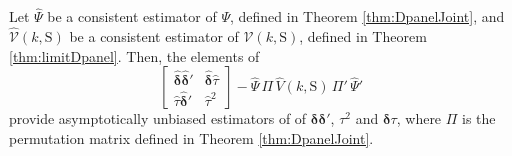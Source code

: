 \begin{cor}
  Let $\widehat{\Psi}$ be a consistent estimator of $\Psi$, defined in Theorem \ref{thm:DpanelJoint}, and $\widehat{\mathcal{V}}(k,\text{S})$ be a consistent estimator of $\mathcal{V}(k,\text{S})$, defined in Theorem \ref{thm:limitDpanel}.
  Then, the elements of  
  \[
    \left[
    \begin{array}{cc}
      \widehat{\boldsymbol{\delta}} \widehat{\boldsymbol{\delta}}' & \widehat{\boldsymbol{\delta}} \widehat{\tau} \\
      \widehat{\tau} \widehat{\boldsymbol{\delta}}' & \widehat{\tau}^2
    \end{array}
  \right] - \widehat{\Psi}\, \Pi \, \widehat{V}(k,\text{S}) \, \Pi' \, \widehat{\Psi}'
  \]
  provide asymptotically unbiased estimators of of $\boldsymbol{\delta}\boldsymbol{\delta}'$, $\tau^2$ and $\boldsymbol{\delta}\tau$, where $\Pi$ is the permutation matrix defined in Theorem \ref{thm:DpanelJoint}.
\end{cor}

